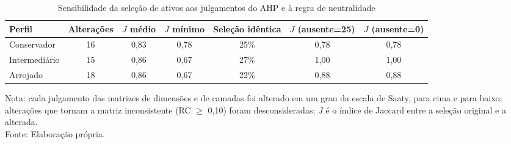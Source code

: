 \begin{table}[htbp]
\centering
\caption{Sensibilidade da seleção de ativos aos julgamentos do AHP e à regra de neutralidade}
\label{tab:sensibilidade}
\footnotesize
\begin{tabular}{|l|c|c|c|c|c|c|}
\hline
\textbf{Perfil} & \textbf{Alterações} & \textbf{$J$ médio} & \textbf{$J$ mínimo} & \textbf{Seleção idêntica} & \textbf{$J$ (ausente=25)} & \textbf{$J$ (ausente=0)} \\
\hline
Conservador & 16 & 0,83 & 0,78 & 25\% & 0,78 & 0,78 \\
\hline
Intermediário & 15 & 0,86 & 0,67 & 27\% & 1,00 & 1,00 \\
\hline
Arrojado & 18 & 0,86 & 0,67 & 22\% & 0,88 & 0,88 \\
\hline
\end{tabular}

\vspace{0.2cm}
\small Nota: cada julgamento das matrizes de dimensões e de camadas foi alterado em um grau da escala de Saaty, para cima e para baixo; alterações que tornam a matriz inconsistente (RC $\geq$ 0,10) foram desconsideradas; $J$ é o índice de Jaccard entre a seleção original e a alterada.\\
Fonte: Elaboração própria.
\end{table}
